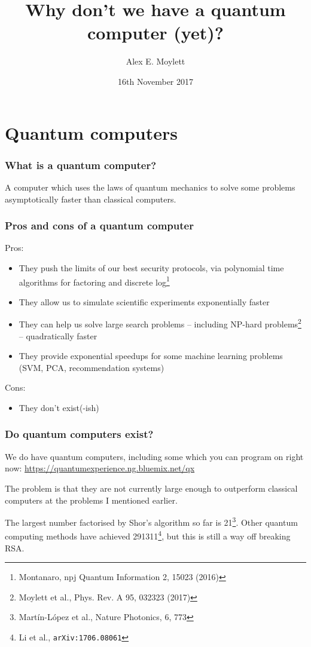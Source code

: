 \documentclass[notes]{beamer}
\title[Why don't we have a quantum computer?]{Why don't we have a quantum computer (yet)?} %
\author[Alex E. Moylett]{Alex E. Moylett} %
\institute[University of Bristol] %
{
Quantum Engineering Technology Labs and Quantum Engineering Centre for Doctoral Training\\
University of Bristol \\ %
\medskip
\textit{\href{mailto:alex.moylett@bristol.ac.uk}{alex.moylett@bristol.ac.uk}} %
}
\date{16th November 2017} %
\begin{document}
\begin{frame}
\titlepage %
\end{frame}


\section{Quantum computers}

\begin{frame}
\frametitle{What is a quantum computer?}
A computer which uses the laws of quantum mechanics to solve some problems asymptotically faster than classical computers.
\end{frame}

\begin{frame}
\frametitle{Pros and cons of a quantum computer}

Pros:
\begin{itemize}
\item<2-> They push the limits of our best security protocols, via polynomial time algorithms for factoring and discrete log\footnote{Montanaro, npj Quantum Information 2, 15023 (2016)}
\item<3-> They allow us to simulate scientific experiments exponentially faster
\item<4-> They can help us solve large search problems -- including NP-hard problems\footnote{Moylett et al., Phys. Rev. A 95, 032323 (2017)} -- quadratically faster
\item<5-> They provide exponential speedups for some machine learning problems (SVM, PCA, recommendation systems)
\end{itemize}

Cons:
\begin{itemize}
\item<6-> They don't exist(-ish)
\end{itemize}
\end{frame}

\begin{frame}
\frametitle{Do quantum computers exist?}

We do have quantum computers, including some which you can program on right now: \url{https://quantumexperience.ng.bluemix.net/qx}

The problem is that they are not currently large enough to outperform classical computers at the problems I mentioned earlier.

The largest number factorised by Shor's algorithm so far is 21\footnote{Martín-López et al., Nature Photonics, 6, 773}. Other quantum computing methods have achieved 291311\footnote{Li et al., {\tt arXiv:1706.08061}}, but this is still a way off breaking RSA.
\end{frame}
\end{document}
